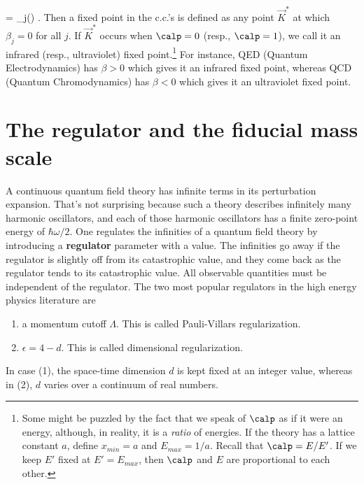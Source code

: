 \beq
{} = \beta_j(\calp)
\;.
\label{eq-dif-kj}
\eeq
Then a fixed point
in the c.c.'s is defined as
any point $\vec{K}^*$
at which $\beta_j=0$
for all $j$.
If $\vec{K}^*$ occurs
when $\calp=0$ (resp., $\calp=1$),
we call it an infrared (resp., ultraviolet)
fixed point.\footnote{Some
might be puzzled
by the fact that
we speak of $\calp$
as if it were an energy,
although, in reality, it is
a {\it ratio} of energies.
If the theory has a lattice
constant $a$, define $x_{min} =a$
and $E_{max} = 1/a$. Recall
that $\calp= E/E'$. If we
keep $E'$ fixed at $E'=E_{max}$,
then $\calp$
and $E$ are proportional to each
other.}
For instance, QED (Quantum Electrodynamics)
has $\beta>0$ which gives it
an infrared fixed point,
whereas QCD (Quantum Chromodynamics)
has $\beta<0$ which gives it an ultraviolet
fixed point.

\section{The regulator and the fiducial
mass scale}
\label{sec-regulator}

A continuous
quantum field
theory has
infinite
terms in its perturbation
expansion. That's
not surprising because
such a theory
describes infinitely many
harmonic
oscillators, and each of
those harmonic oscillators  has a
finite zero-point energy of $\hbar\omega/2$.
One regulates the infinities
of a quantum field theory
by introducing a \textbf{regulator}
parameter with a  value.
The
infinities go away if
the regulator is slightly
off from its catastrophic
value, and they come back as
 the regulator
tends to its catastrophic
value.  All
observable
quantities must
be independent of the regulator.
The two most popular
regulators in the high
energy physics literature
are
\begin{enumerate}
\item
a momentum cutoff $\Lambda$. This
is called Pauli-Villars regularization.
\item
$\epsilon = 4 -d$. This is called
dimensional regularization.
\end{enumerate}

In case (1), the space-time
dimension $d$ is kept
fixed at an integer value, whereas
in (2), $d$ varies
over a continuum of real
numbers.

